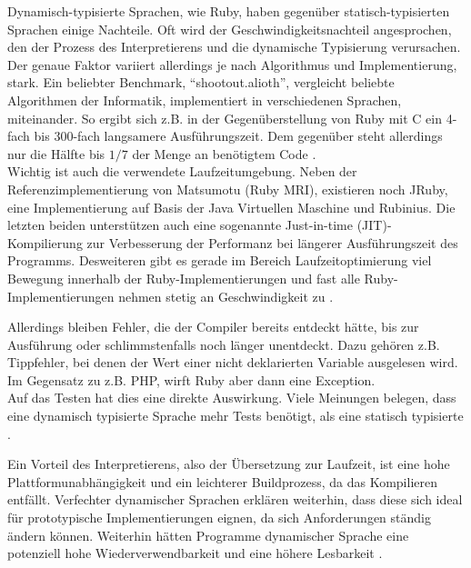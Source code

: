 Dynamisch-typisierte Sprachen, wie Ruby, haben gegenüber statisch-typisierten Sprachen einige Nachteile. Oft wird der Geschwindigkeitsnachteil angesprochen, den der Prozess des Interpretierens und die dynamische Typisierung verursachen.
Der genaue Faktor variiert allerdings je nach Algorithmus und Implementierung, stark. Ein beliebter Benchmark, "`shootout.alioth"', vergleicht beliebte Algorithmen der Informatik, implementiert in verschiedenen Sprachen, miteinander. So ergibt sich z.B. in der Gegenüberstellung von Ruby mit C ein 4-fach bis 300-fach langsamere Ausführungszeit. Dem gegenüber steht allerdings nur die Hälfte bis $1/7$ der Menge an benötigtem Code \citep{computer_language_benchmarks_game_ruby_2011}. \\
Wichtig ist auch die verwendete Laufzeitumgebung. Neben der Referenzimplementierung von Matsumotu (Ruby MRI), existieren noch JRuby, eine Implementierung auf Basis der Java Virtuellen Maschine und Rubinius. Die letzten beiden unterstützen auch eine sogenannte Just-in-time (JIT)-Kompilierung zur Verbesserung der Performanz bei längerer Ausführungszeit des Programms. Desweiteren gibt es gerade im Bereich Laufzeitoptimierung viel Bewegung innerhalb der Ruby-Implementierungen und fast alle Ruby-Implementierungen nehmen stetig an Geschwindigkeit zu \citep{antonio_cangiano_great_2010}.


Allerdings bleiben Fehler, die der Compiler bereits entdeckt hätte, bis zur Ausführung oder schlimmstenfalls noch länger unentdeckt. Dazu gehören z.B. Tippfehler, bei denen der Wert einer nicht deklarierten Variable ausgelesen wird. Im Gegensatz zu z.B. PHP, wirft Ruby aber dann eine Exception.\\
Auf das Testen hat dies eine direkte Auswirkung. Viele Meinungen belegen, dass eine dynamisch typisierte Sprache mehr Tests benötigt, als eine statisch typisierte \citep{daniel_spiewak_dynamic_2010}.



Ein Vorteil des Interpretierens, also der Übersetzung zur Laufzeit, ist eine hohe Plattformunabhängigkeit und ein leichterer Buildprozess, da das Kompilieren entfällt.
Verfechter dynamischer Sprachen erklären weiterhin, dass diese sich ideal für prototypische Implementierungen eignen, da sich Anforderungen ständig ändern können. Weiterhin hätten Programme dynamischer Sprache eine potenziell hohe Wiederverwendbarkeit und eine höhere Lesbarkeit \citep{meijer_static_2005} \citep{ousterhout_scripting:_1998}.


